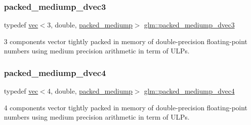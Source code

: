\subsubsection{\texorpdfstring{packed\+\_\+mediump\+\_\+dvec3}{packed\_mediump\_dvec3}}
{\footnotesize\ttfamily typedef \hyperlink{structglm_1_1vec}{vec}$<$3, double, \hyperlink{namespaceglm_a36ed105b07c7746804d7fdc7cc90ff25a9604654c3b137cd7898689fd34b25bc0}{packed\+\_\+mediump}$>$ \hyperlink{group__gtc__type__aligned_ga0c34c771e940f66eccff81d402f83cdd}{glm\+::packed\+\_\+mediump\+\_\+dvec3}}



3 components vector tightly packed in memory of double-\/precision floating-\/point numbers using medium precision arithmetic in term of U\+L\+Ps. 

\mbox{\label{group__gtc__type__aligned_gaa88ce743e1248a4e822e591e6bdf071b}} 
\subsubsection{\texorpdfstring{packed\+\_\+mediump\+\_\+dvec4}{packed\_mediump\_dvec4}}
{\footnotesize\ttfamily typedef \hyperlink{structglm_1_1vec}{vec}$<$4, double, \hyperlink{namespaceglm_a36ed105b07c7746804d7fdc7cc90ff25a9604654c3b137cd7898689fd34b25bc0}{packed\+\_\+mediump}$>$ \hyperlink{group__gtc__type__aligned_gaa88ce743e1248a4e822e591e6bdf071b}{glm\+::packed\+\_\+mediump\+\_\+dvec4}}



4 components vector tightly packed in memory of double-\/precision floating-\/point numbers using medium precision arithmetic in term of U\+L\+Ps. 

\mbox{\label{group__gtc__type__aligned_ga2086cbb8b85fe406f4be46fdff491304}} 

